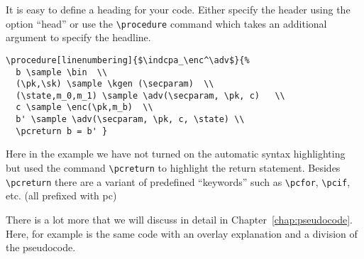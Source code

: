 \documentclass[a4paper]{report}
\begin{document}
It is easy to define a heading for your code. Either specify the header using the option \enquote{head} or use 
the \lstinline$\procedure$ command which takes an additional argument to specify the headline.
\begin{center}
\end{center}

\begin{lstlisting}
\procedure[linenumbering]{$\indcpa_\enc^\adv$}{%
  b \sample \bin  \\
  (\pk,\sk) \sample \kgen (\secparam)  \\
  (\state,m_0,m_1) \sample \adv(\secparam, \pk, c)   \\
  c \sample \enc(\pk,m_b)  \\
  b' \sample \adv(\secparam, \pk, c, \state) \\
  \pcreturn b = b' }
\end{lstlisting}
Here in the example we have not turned on the automatic syntax highlighting but used the command \lstinline$\pcreturn$
to highlight the return statement. Besides \lstinline$\pcreturn$ there are a variant of predefined \enquote{keywords}
such as \lstinline$\pcfor$, \lstinline$\pcif$, etc. (all prefixed with pc)

There is a lot more that we will discuss in detail in Chapter~\ref{chap:pseudocode}. Here, for example
is the same code with an overlay explanation and a division of the pseudocode.
\begin{center}
\end{center}
\end{document}
